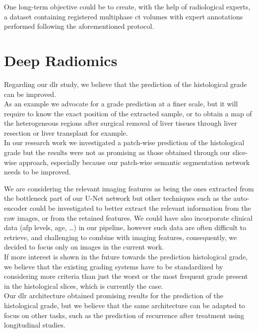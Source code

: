 One long-term objective could be to create, with the help of
radiological experts, a dataset containing registered multiphase \ac{ct}
volumes with expert annotations performed following the aforementioned
protocol.

\section{Deep Radiomics}

Regarding our \ac{dlr} study, we believe that the prediction of the
histological grade can be improved. \\
As an example we advocate for a grade prediction at a finer
scale, but it will require to know the exact position of the extracted
sample, or to obtain a map of the heterogeneous regions after surgical
removal of liver tissues through liver resection or liver transplant for
example.\\
In our research work we investigated a patch-wise prediction of the
histological grade but the results were not as promising as those
obtained through our slice-wise approach, especially because our
patch-wise semantic segmentation network needs to be improved.

We are considering the relevant imaging features as being the
ones extracted from the bottleneck part of our U-Net network but other
techniques such as the auto-encoder could be investigated to better
extract the relevant information from the raw images, or from the
retained features. We could have also incorporate clinical
data (\ac{afp} levels, age, \ldots{}) in our pipeline, however such data are
often difficult to retrieve, and challenging to combine with imaging
features, consequently, we decided to focus only on images in the
current work.\\
If more interest is shown in the future towards the prediction
histological grade, we believe that the existing grading systems have to
be standardized by considering more criteria than just the worst or the
most frequent grade present in the histological slices, which is
currently the case.\\
Our \ac{dlr} architecture obtained promising results for the prediction of
the histological grade, but we believe that the same architecture can be
adapted to focus on other tasks, such as the prediction of
recurrence after treatment using longitudinal studies.
